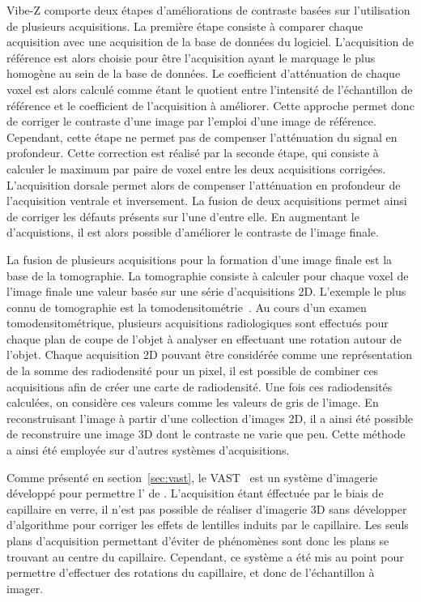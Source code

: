 \documentclass[\main/main.tex]{subfiles}
\begin{document}
%
Vibe-Z comporte deux étapes d'améliorations de contraste basées sur l'utilisation de plusieurs acquisitions. La première étape consiste à comparer chaque acquisition avec une acquisition de la base de données du logiciel.
%
L'acquisition de référence est alors choisie pour être l'acquisition ayant le marquage le plus homogène au sein de la base de données.
%
Le coefficient d'atténuation de chaque voxel est alors calculé comme étant le quotient entre l'intensité de l'échantillon de référence et le coefficient de l'acquisition à améliorer.
%
Cette approche permet donc de corriger le contraste d'une image par l'emploi d'une image de référence.
%
Cependant, cette étape ne permet pas de compenser l'atténuation du signal en profondeur.
%
Cette correction est réalisé par la seconde étape, qui consiste à calculer le maximum par paire de voxel entre les deux acquisitions corrigées.
%
L'acquisition dorsale permet alors de compenser l'atténuation en profondeur de l'acquisition ventrale et inversement.
%
La fusion de deux acquisitions permet ainsi de corriger les défauts présents sur l'une d'entre elle.
%
En augmentant le  d'acquistions, il est alors possible d'améliorer le contraste de l'image finale.

%
La fusion de plusieurs acquisitions pour la formation d'une image finale est la base de la tomographie.
%
La tomographie consiste à calculer pour chaque voxel de l'image finale une valeur basée sur une série d'acquisitions 2D.
%
L'exemple le plus connu de tomographie est la tomodensitométrie~\cite{hounsfield_1973}.
%
Au cours d'un examen tomodensitométrique, plusieurs acquisitions radiologiques sont effectués pour chaque plan de coupe de l'objet à analyser en effectuant une rotation autour de l'objet.
%
Chaque acquisition 2D pouvant être considérée comme une représentation de la somme des radiodensité pour un pixel,
il est possible de combiner ces acquisitions afin de créer une carte de radiodensité.
%
Une fois ces radiodensités calculées, on considère ces valeurs comme les valeurs de gris de l'image.
%
En reconstruisant l'image à partir d'une collection d'images 2D, il a ainsi été possible de reconstruire une image 3D dont le contraste ne varie que peu.
%
Cette méthode a ainsi été employée sur d'autres systèmes d'acquisitions.

%
Comme présenté en section~\ref{sec:vast}, le VAST~\cite{pardomartin_2010} est un système d'imagerie développé pour permettre l'\hti{} de \pz{}.
%
L'acquisition étant éffectuée par le biais de capillaire en verre, il n'est pas possible de réaliser d'imagerie 3D sans développer d'algorithme pour corriger les effets de lentilles induits par le capillaire.
%
Les seuls plans d'acquisition permettant d'éviter de phénomènes sont donc les plans se trouvant au centre du capillaire.
%
Cependant, ce système a été mis au point pour permettre d'effectuer des rotations du capillaire, et donc de l'échantillon à imager.
\end{document}
